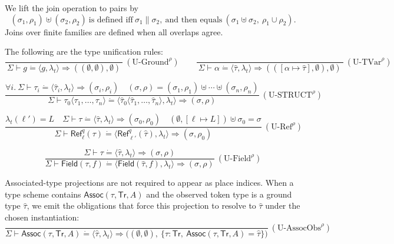 \documentclass[runningheads]{llncs}
\newcommand{\Join}{\mathbin{\uplus}}
\newcommand{\unify}{\mathrel{\dot{=}}}
\begin{document}
We lift the join operation to pairs by
\begin{equation*}
  (\sigma_1,\rho_1)\Join(\sigma_2,\rho_2)\ \text{is defined iff}\ 
\sigma_1\parallel\sigma_2,\ \text{and then equals}\ (\sigma_1\Join\sigma_2,\ \rho_1\cup\rho_2).  
\end{equation*}
Joins over finite families are defined when all overlaps agree.

The following are the type unification rules:
\begin{equation*}
    \frac{}{~\Sigma \vdash g \unify \langle g,\lambda_t\rangle \Rightarrow ((\emptyset,\emptyset),\emptyset)~}
\ (\text{U-Ground}^{\rho})
\qquad
\frac{}{~\Sigma \vdash \alpha \unify \langle \hat\tau,\lambda_t\rangle \Rightarrow (([\alpha\mapsto \hat\tau],\emptyset),\emptyset)~}
\ (\text{U-TVar}^{\rho})
\end{equation*}

\begin{equation*}
    \frac{
\forall i.\ \Sigma \vdash \tau_i \unify \langle \hat\tau_i,\lambda_t\rangle \Rightarrow (\sigma_i,\rho_i)
\quad
(\sigma,\rho)= (\sigma_1,\rho_1)\Join\cdots\Join(\sigma_n,\rho_n)
}{
\Sigma \vdash \tau_0\langle \tau_1,\dots,\tau_n\rangle \unify
\langle \hat\tau_0\langle \hat\tau_1,\dots,\hat\tau_n\rangle,\lambda_t\rangle
\Rightarrow (\sigma,\rho)
}
\ (\text{U-STRUCT}^{\rho})
\end{equation*}

\begin{equation*}
  \frac{
\lambda_t(\ell')=L
\quad
\Sigma \vdash \tau \unify \langle \hat\tau,\lambda_t\rangle \Rightarrow (\sigma_0,\rho_0)
\quad
(\emptyset,[\ell\mapsto L]) \Join \sigma_0 = \sigma
}{
\Sigma \vdash \mathsf{Ref}^q_{\ell}(\tau) \unify \langle \mathsf{Ref}^q_{\ell'}(\hat\tau),\lambda_t\rangle
\Rightarrow (\sigma,\rho_0)
}
\ (\text{U-Ref}^{\rho})  
\end{equation*}

\begin{equation*}
    \frac{
\Sigma \vdash \tau \unify \langle \hat\tau,\lambda_t\rangle \Rightarrow (\sigma,\rho)
}{
\Sigma \vdash \mathsf{Field}(\tau,f) \unify \langle \mathsf{Field}(\hat\tau,f),\lambda_t\rangle \Rightarrow (\sigma,\rho)
}
\ (\text{U-Field}^{\rho})
\end{equation*}

Associated-type projections are not required to appear as place indices.
When a type scheme contains $\mathsf{Assoc}(\tau,\mathsf{Tr},A)$ and the observed token type is a ground type $\hat\tau$, we emit the obligations that force this projection to resolve to $\hat\tau$ under the chosen instantiation:
\begin{equation*}
    \frac{}{ \Sigma \vdash \mathsf{Assoc}(\tau,\mathsf{Tr},A) \unify \langle \hat\tau,\lambda_t\rangle \Rightarrow \Big((\emptyset,\emptyset),\ \{\tau:\mathsf{Tr},\ \mathsf{Assoc}(\tau,\mathsf{Tr},A)=\hat\tau\}\Big) }
\ (\text{U-AssocObs}^{\rho})
\end{equation*}
\end{document}
